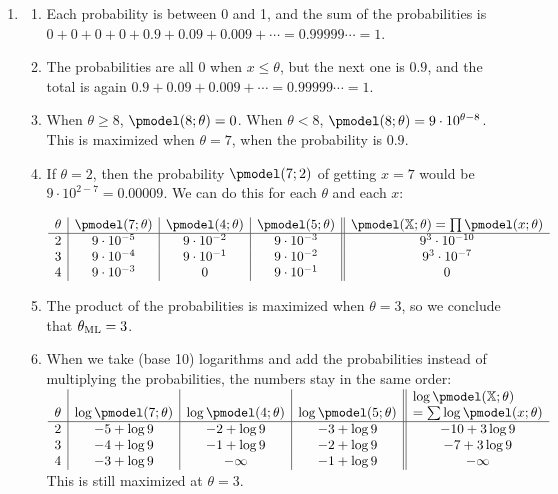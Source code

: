 \documentclass{article}
\begin{document}
\begin{enumerate}
\item \label{ML_ex_maximumlikelihood_solution}
\begin{enumerate}
    \item Each probability is between 0 and 1, and the sum of the probabilities is $0 + 0 + 0 + 0 + 0.9 + 0.09 + 0.009 + \cdots = 0.99999\cdots = 1$.
    \item The probabilities are all 0 when $x \leq \theta$, but the next one is $0.9$, and the total is again $0.9 + 0.09 + 0.009 +\cdots = 0.99999\cdots = 1$.
    \item When $\theta \geq 8$, $\pmodel(8; \theta) = 0$. When $\theta < 8$, $\pmodel(8; \theta) = 9\cdot10^{\theta - 8}$. This is maximized when $\theta = 7$, when the probability is $0.9$.
    \item If $\theta = 2$, then the probability $\pmodel(7; 2)$ of getting $x = 7$ would be $9 \cdot 10^{2-7} = 0.00009$. We can do this for each $\theta$ and each $x$:
        
    $\begin{array}{c|c|c|c||c}
        \theta & \pmodel(7; \theta) & \pmodel(4; \theta) & \pmodel(5; \theta) & \pmodel(\mathbb{X}; \theta) = \prod \pmodel(x;\theta) \\
        \hline
        2 & 9 \cdot 10^{-5} & 9 \cdot 10^{-2} & 9 \cdot 10^{-3} & 9^3 \cdot 10^{-10}\\
        3 & 9 \cdot 10^{-4} & 9 \cdot 10^{-1} & 9 \cdot 10^{-2} & 9^3 \cdot 10^{-7}\\
        4 & 9 \cdot 10^{-3} & 0 & 9 \cdot 10^{-1} & 0\\
    \end{array}$
    \item The product of the probabilities is maximized when $\theta = 3$, so we conclude that $\theta_\textnormal{ML} = 3$. 
    \item When we take (base 10) logarithms and add the probabilities instead of multiplying the probabilities, the numbers stay in the same order:
    $\begin{array}{c|c|c|c||c}
        \theta & \log\pmodel(7; \theta) & \log\pmodel(4; \theta) & \log\pmodel(5; \theta) & \vbox{\hbox{\strut$\log\pmodel(\mathbb{X}; \theta)$}\hbox{\strut $= \sum \log\pmodel(x;\theta)$}} \\
        \hline
        2 & -5 + \log 9 & -2 + \log 9 & -3 + \log 9 & -10 + 3 \log 9 \\
        3 & -4 + \log 9 & -1 + \log 9 & -2 + \log 9 & -7  + 3 \log 9 \\
        4 & -3 + \log 9 & -\infty     & -1 + \log 9 & -\infty \\
    \end{array}$
    This is still maximized at $\theta = 3$.
\end{enumerate}


\end{enumerate}
\end{document}
